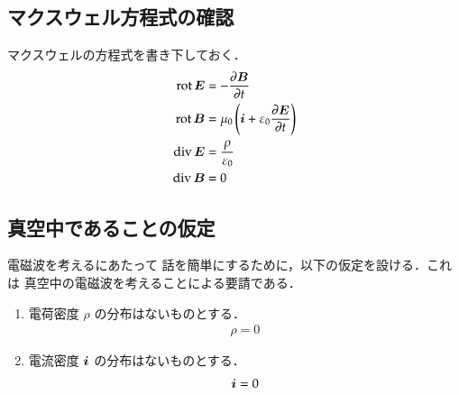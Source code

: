     \subsection{マクスウェル方程式の確認}
        マクスウェルの方程式を書き下しておく．
        \begin{align}
            \mathrm{rot}\, \boldsymbol{E}
            &=
            -\frac{\partial \boldsymbol{B}}{\partial t}\\
            \mathrm{rot}\,\boldsymbol{B}
            &=
            \mu_{0}\left(\boldsymbol{i}+
                \varepsilon_{0}\frac{\partial \boldsymbol{E}}{\partial t}
            \right)\\
            \mathrm{div}\,\boldsymbol{E}
            &=\frac{\rho}{\varepsilon_{0}}\\
            \mathrm{div}\,\boldsymbol{B}
            &=
            0\\
        \end{align}

    \subsection{真空中であることの仮定}
        電磁波を考えるにあたって 話を簡単にするために，以下の仮定を設ける．これは
        真空中の電磁波を考えることによる要請である．
        \begin{enumerate}
        \item 電荷密度 $\rho$ の分布はないものとする．
                                \begin{align}
                                \rho
                                =0
                                \end{align}
        \item 電流密度 $\boldsymbol{i}$ の分布はないものとする．
                                \begin{align}
                                \boldsymbol{i}
                                =0
                                \end{align}
        \end{enumerate}




